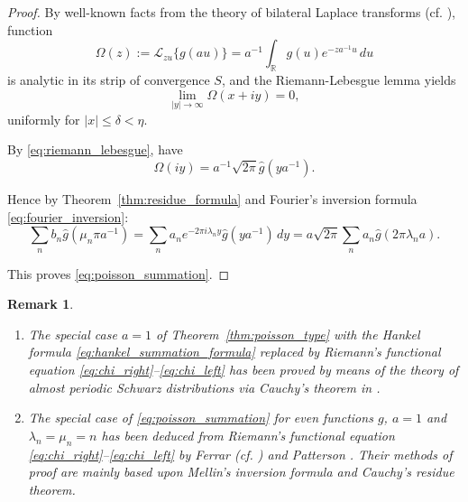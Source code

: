 \documentclass[11pt]{article}
\theoremstyle{plain}
\newtheorem{remark}[theorem]{Remark}
\begin{document}
\begin{proof}
By well-known facts from the theory of bilateral Laplace transforms (cf. \cite{16}), function
\begin{equation}
\Omega(z) := \mathcal{L}_{zu}\{g(au)\} = a^{-1} \int_{\mathbb{R}} g(u) e^{-za^{-1}u} \, du
\label{eq:poisson_proof_1}
\end{equation}
is analytic in its strip of convergence $S$, and the Riemann-Lebesgue lemma yields
\begin{equation}
\lim_{|y| \to \infty} \Omega(x + iy) = 0,
\label{eq:riemann_lebesgue}
\end{equation}
uniformly for $|x| \leq \delta < \eta$.

By \eqref{eq:riemann_lebesgue}, have
\begin{equation}
\Omega(iy) = a^{-1} \sqrt{2\pi} \hat{g}(ya^{-1}).
\label{eq:poisson_proof_2}
\end{equation}

Hence by Theorem~\ref{thm:residue_formula} and Fourier's inversion formula \eqref{eq:fourier_inversion}:
\begin{equation}
\sum_{n} b_n \hat{g}(\mu_n \pi a^{-1}) = \sum_{n} a_n e^{-2\pi i \lambda_n y} \hat{g}(ya^{-1}) \, dy = a\sqrt{2\pi} \sum_{n} a_n \hat{g}(2\pi \lambda_n a).
\label{eq:poisson_proof_3}
\end{equation}

This proves \eqref{eq:poisson_summation}.
\end{proof}

\begin{remark}
\label{rem:poisson_remarks}
\begin{enumerate}[label=(\roman*)]
\item The special case $a = 1$ of Theorem~\ref{thm:poisson_type} with the Hankel formula \eqref{eq:hankel_summation_formula} replaced by Riemann's functional equation \eqref{eq:chi_right}--\eqref{eq:chi_left} has been proved by means of the theory of almost periodic Schwarz distributions via Cauchy's theorem in \cite{22}.
\item The special case of \eqref{eq:poisson_summation} for even functions $g$, $a = 1$ and $\lambda_n = \mu_n = n$ has been deduced from Riemann's functional equation \eqref{eq:chi_right}--\eqref{eq:chi_left} by Ferrar (cf. \cite{1,18}) and Patterson \cite{26}. Their methods of proof are mainly based upon Mellin's inversion formula and Cauchy's residue theorem.
\end{enumerate}
\end{remark}
\end{document}
